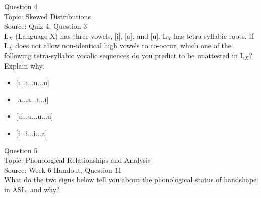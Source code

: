 \documentclass[12pt]{article}
\begin{document}
\newpage

{\large Question 4}\\

Topic: Skewed Distributions\\
Source: Quiz 4, Question 3\\

L$_X$ (Language X) has three vowels, [i], [a], and [u]. L$_X$ has tetra-syllabic roots. If L$_X$ does not allow non-identical high vowels to co-occur, which one of the following tetra-syllabic vocalic sequences do you predict to be unattested in L$_X$? Explain why.\\

\begin{itemize} \item {[i...i...u...u]} \item {[a...a...i...i]} \item {[u...u...u...u]} \item {[i...i...i...a]} \end{itemize}


\newpage

{\large Question 5}\\

Topic: Phonological Relationships and Analysis\\
Source: Week 6 Handout, Question 11\\

What do the two signs below tell you about the phonological status of \underline{handshape} in ASL, and why?\\
\end{document}
